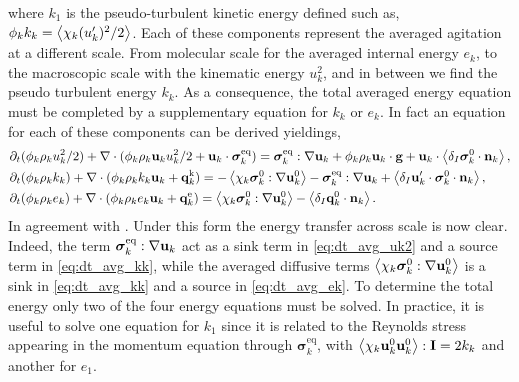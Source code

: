where $k_1$ is the pseudo-turbulent kinetic energy defined such as, $\phi_k k_k = \left<\chi_k (u_k')^2/2\right>$. 
Each of these components represent the averaged agitation at a different scale. 
From molecular scale for the averaged internal energy $e_k$, to the macroscopic scale with the kinematic energy $u_k^2$, and in between we find the pseudo turbulent energy $k_k$. 
As a consequence, the total averaged energy equation must be completed by a supplementary equation for $k_k$ or $e_k$. 
In fact an equation for each of these components can be derived yieldings, 
\begin{align}
    \label{eq:dt_avg_uk2}
    &\partial_t (\phi_k \rho_ku_k^2/2)  
    + \mathbf{\nabla}\cdot (
        \phi_k \rho_k\textbf{u}_ku_k^2/2
        + \textbf{u}_k \cdot \bm{\sigma}_k^\text{eq}
    )
    = 
    \bm{\sigma}_k^\text{eq} : \mathbf{\nabla} \textbf{u}_k
    + \phi_k \rho_k \textbf{u}_k\cdot \textbf{g} 
    +  \textbf{u}_k\cdot \left<\delta_I \bm{\sigma}_k^0 \cdot \textbf{n}_k\right>,\\
    \label{eq:dt_avg_kk}
    &\partial_t (\phi_k\rho_kk_k)  
    + \mathbf{\nabla}\cdot (
        \phi_k\rho_kk_k\textbf{u}_k
        + \textbf{q}_k^\text{k} 
        )
    = 
    - \left<\chi_k\bm{\sigma}_k^0 : \mathbf{\nabla} \textbf{u}_k^0\right>
    - \bm{\sigma}_k^\text{eq} : \mathbf{\nabla} \textbf{u}_k
    + \left<\delta_I \textbf{u}_k' \cdot \bm{\sigma}_k^0 \cdot \textbf{n}_k\right>,\\
    \label{eq:dt_avg_ek}
    &\partial_t (\phi_k\rho_ke_k)  
    + \mathbf{\nabla}\cdot (
        \phi_k \rho_ke_k\textbf{u}_k
        +
        \textbf{q}_k^\text{e} 
        )
    = 
    \left<\chi_k\bm{\sigma}_k^0 : \mathbf{\nabla} \textbf{u}_k^0\right>
    - \left<\delta_I \textbf{q}_k^0 \cdot \textbf{n}_k\right>. 
\end{align}
In agreement with \citet{morel2015mathematical}. 
Under this form the energy transfer across scale is now clear. 
Indeed, the term $\bm{\sigma}_k^\text{eq} : \mathbf{\nabla} \textbf{u}_k$ act as a sink term in \ref{eq:dt_avg_uk2} and a source term in \ref{eq:dt_avg_kk}, while the averaged diffusive terms $\left<\chi_k\bm{\sigma}_k^0 : \mathbf{\nabla} \textbf{u}_k^0\right>$ is a sink in \ref{eq:dt_avg_kk} and a source in \ref{eq:dt_avg_ek}. 
To determine the total energy only two of the four energy equations must be solved. 
In practice, it is useful to solve one equation for $k_1$ since it is related to the Reynolds stress appearing in the momentum equation through $\bm{\sigma}^\text{eq}_k$, with $\left<\chi_k \textbf{u}_k^0 \textbf{u}_k^0\right>: \textbf{I} = 2 k_k$ and another for $e_1$. 


